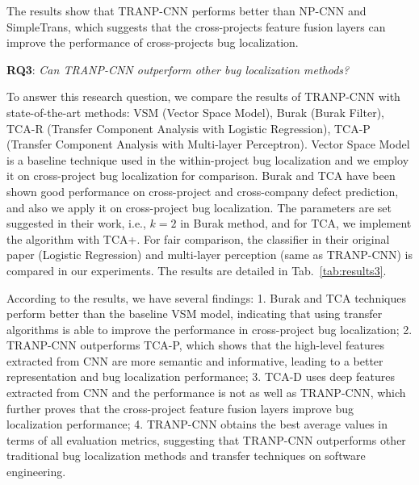 The results show that TRANP-CNN performs better than NP-CNN and SimpleTrans, which suggests that the cross-projects feature fusion layers can improve the performance of cross-projects bug localization.

\textbf{RQ3}: \textit{Can TRANP-CNN outperform other bug localization methods?}

To answer this research question, we compare the results of TRANP-CNN with state-of-the-art methods: VSM (Vector Space Model), Burak (Burak Filter), TCA-R (Transfer Component Analysis with Logistic Regression), TCA-P (Transfer Component Analysis with Multi-layer Perceptron). Vector Space Model is a baseline technique used in the within-project bug localization and we employ it on cross-project bug localization for comparison. Burak and TCA have been shown good performance on cross-project and cross-company defect prediction, and also we apply it on cross-project bug localization. The parameters are set suggested in their work, i.e., $k=2$ in Burak method, and for TCA, we implement the algorithm with TCA+. For fair comparison, the classifier in their original paper (Logistic Regression) and multi-layer perception (same as TRANP-CNN) is compared in our experiments. The results are detailed in Tab.~\ref{tab:results3}.

According to the results, we have several findings: 1. Burak and TCA techniques perform better than the baseline VSM model, indicating that using transfer algorithms is able to improve the performance in cross-project bug localization; 2. TRANP-CNN outperforms TCA-P, which shows that the high-level features extracted from CNN are more semantic and informative, leading to a better representation and bug localization performance; 3. TCA-D uses deep features extracted from CNN and the performance is not as well as TRANP-CNN, which further proves that the cross-project feature fusion layers improve bug localization performance; 4. TRANP-CNN obtains the best average values in terms of all evaluation metrics, suggesting that TRANP-CNN outperforms other traditional bug localization methods and transfer techniques on software engineering.


